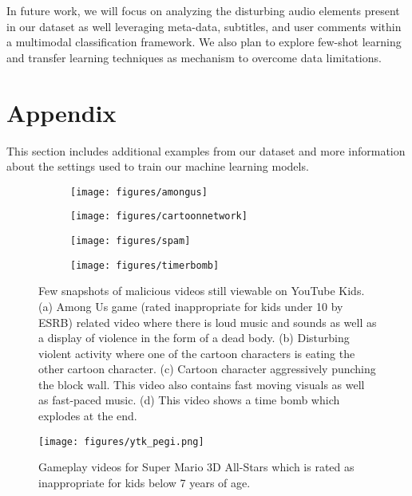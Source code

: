 \documentclass[letterpaper]{article}
\begin{document}
In future work, we will focus on analyzing the disturbing audio elements present in our dataset as well leveraging meta-data, subtitles, and user comments within a multimodal classification framework. We also plan to explore few-shot learning and transfer learning techniques as mechanism to overcome data limitations.

 

\clearpage
\onecolumn
\section*{Appendix}
This section includes additional examples from our dataset and more information about the settings used to train our machine learning models.


\begin{figure*}[!h]
  \begin{subfigure}{.42\textwidth}
    \centering
    \texttt{[image: figures/amongus]}
    \caption{ }
  \end{subfigure}
  \hfill
  \begin{subfigure}{.42\textwidth}
    \centering
    \texttt{[image: figures/cartoonnetwork]}
    \caption{ }
  \end{subfigure}

  \medskip

  \begin{subfigure}{.42\textwidth}
    \centering
    \texttt{[image: figures/spam]}
    \caption{ }
  \end{subfigure}
  \hfill
  \begin{subfigure}{.42\textwidth}
    \centering
    \texttt{[image: figures/timerbomb]}
    \caption{ }
  \end{subfigure}
  \caption{Few snapshots of malicious videos still viewable on YouTube Kids. (a) Among Us game (rated inappropriate for kids under 10 by ESRB) related video where there is loud music and sounds as well as a display of violence in the form of a dead body. (b) Disturbing violent activity where one of the cartoon characters is eating the other cartoon character. (c) Cartoon character aggressively punching the block wall. This video also contains fast moving visuals as well as fast-paced music. (d) This video shows a time bomb which explodes at the end.}
\label{fig:fig1}
\end{figure*}

\begin{figure*}[htp]
    \centering
    \texttt{[image: figures/ytk\_pegi.png]}
    \caption{Gameplay videos for Super Mario 3D All-Stars which is rated as inappropriate for kids below 7 years of age.}
    \label{fig:ytkpegi}
\end{figure*}
\end{document}
